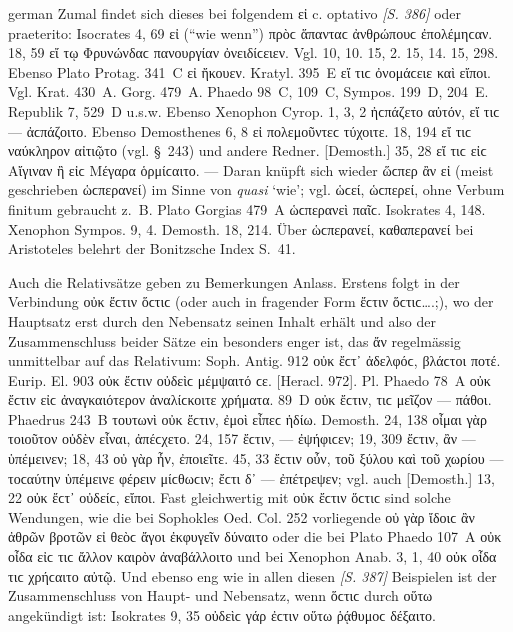 \begin{otherlanguage*}{german}
Zumal findet sich dieses bei folgendem εἰ c. optativo \hypertarget{p386}{\emph{[S. 386]}}\label{p386} oder praeterito: Isocrates 4, 69  εἰ (“wie wenn”) πρὸϲ ἅπανταϲ ἀνθρώπουϲ ἐπολέμηϲαν. 18, 59  εἴ τῳ Φρυνώνδαϲ πανουργίαν ὀνειδίϲειεν. Vgl. 10, 10. 15, 2. 15, 14. 15, 298. Ebenso Plato Protag. 341~C  εἰ ἤκουεν. Kratyl. 395~Ε  εἴ τιϲ ὀνομάϲειε καὶ εἴποι. Vgl. Krat. 430~A. Gorg. 479~A. Phaedo 98~C, 109~C, Sympos. 199~D, 204~E. Republik 7, 529~D u.s.w. Ebenso Xenophon Cyrop. 1, 3, 2 ἠϲπάζετο αὐτόν,  εἴ τιϲ — ἀϲπάζοιτο. Ebenso Demosthenes 6, 8  εἰ πολεμοῦντεϲ τύχοιτε. 18, 194  εἴ τιϲ ναύκληρον αἰτιῷτο (vgl. §~243) und andere Redner. [Demosth.] 35, 28  εἴ τιϲ εἰϲ Αἴγιναν ἢ εἰϲ Μέγαρα ὁρμίϲαιτο. — Daran knüpft sich wieder ὥϲπερ ἂν εἰ (meist geschrieben ὡϲπερανεί) im Sinne von \emph{quasi} ‘wie’; vgl. ὡϲεί, ὡϲπερεί, ohne Verbum finitum gebraucht z.~B. Plato Gorgias 479~A ὡϲπερανεὶ παῖϲ. Isokrates 4, 148. Xenophon Sympos. 9, 4. Demosth. 18, 214. Über ὡϲπερανεί, καθαπερανεί bei Aristoteles belehrt der Bonitzsche Index S.~41.

Auch die Relativsätze geben zu Bemerkungen Anlass. Erstens folgt in der Verbindung οὐκ ἔϲτιν ὅϲτιϲ (oder auch in fragender Form ἔϲτιν ὅϲτιϲ….;), wo der Hauptsatz erst durch den Nebensatz seinen Inhalt erhält und also der Zusammenschluss beider Sätze ein besonders enger ist, das ἄν regelmässig unmittelbar auf das Relativum: Soph. Antig. 912 οὐκ ἔϲτ᾽ ἀδελφόϲ,  βλάϲτοι ποτέ. Eurip. El. 903 οὐκ ἔϲτιν οὐδεὶϲ  μέμψαιτό ϲε. [Heracl. 972]. Pl. Phaedo 78~A οὐκ ἔϲτιν εἰϲ  ἀναγκαιότερον ἀναλίϲκοιτε χρήματα. 89~D οὐκ ἔϲτιν,  τιϲ μεῖζον — πάθοι. Phaedrus 243~Β τουτωνὶ οὐκ ἔϲτιν,  ἐμοὶ εἶπεϲ ἡδίω. Demosth. 24, 138 οἶμαι γὰρ τοιοῦτον οὐδὲν εἶναι,  ἀπέϲχετο. 24, 157 ἔϲτιν,  — ἐψήφιϲεν; 19, 309 ἔϲτιν,  ἂν — ὑπέμεινεν; 18, 43 οὐ γὰρ ἦν,  ἐποιεῖτε. 45, 33 ἔϲτιν οὖν,  τοῦ ξύλου καὶ τοῦ χωρίου — τοϲαύτην ὑπέμεινε φέρειν μίϲθωϲιν; ἔϲτι δ᾽  — ἐπέτρεψεν; vgl. auch [Demosth.] 13, 22 οὐκ ἔϲτ᾽ οὐδείϲ,  εἴποι. Fast gleichwertig mit οὐκ ἔϲτιν ὅϲτιϲ sind solche Wendungen, wie die bei Sophokles Oed. Col. 252 vorliegende οὐ γὰρ ἴδοιϲ ἂν ἀθρῶν βροτῶν  εἰ θεὸϲ ἄγοι ἐκφυγεῖν δύναιτο oder die bei Plato Phaedo 107~Α οὐκ οἶδα εἰϲ  τιϲ ἄλλον καιρὸν ἀναβάλλοιτο und bei Xenophon Anab. 3, 1, 40 οὐκ οἶδα  τιϲ χρήϲαιτο αὐτῷ. Und ebenso eng wie in allen diesen \hypertarget{p387}{\emph{[S. 387]}}\label{p387} Beispielen ist der Zusammenschluss von Haupt- und Nebensatz, wenn ὅϲτιϲ durch οὕτω angekündigt ist: Isokrates 9, 35 οὐδεὶϲ γάρ ἐϲτιν οὕτω ῥᾴθυμοϲ  δέξαιτο.


\end{otherlanguage*}
